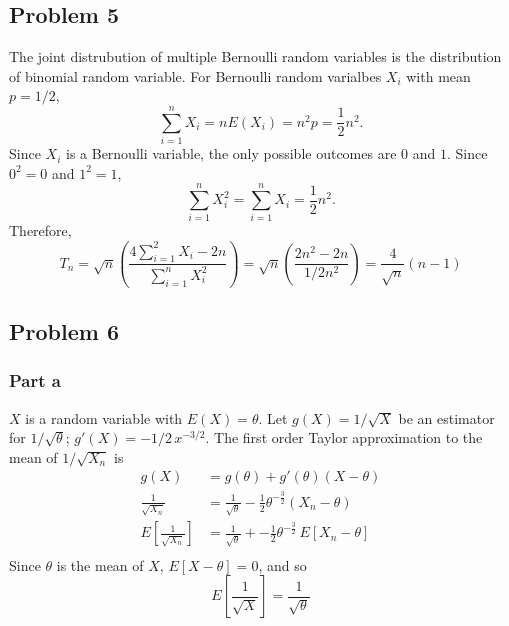 \documentclass{article}
\begin{document}
\iffalse
The probability function of a Poisson random variable with $E(x) = \lambda$ is \[\frac{\lambda^je^{-\lambda}}{j!},\] so for $X_k$ with $E(X_k) = k^{-2}$, \[f_{X_k}(x) = \frac{k^{-2j}\exp\left(-\frac{1}{k^2}\right)}{j!},\] for all non-negative integrers $j$, and $0$ otherwise.
$T_n$ can then be expressed as the sum of a series 
\[\begin{aligned}
T_n &= \sum_{k=1}^{n}\frac{k^{-2j}\exp\left(-\frac{1}{k^2}\right)}{j!} \\
&=\frac{1}{j!}\sum_{k=1}^{n}\, k^{-2j}e^{-\frac{1}{k^2}}.\end{aligned}\]


Since $e^{-\frac{1}{k^2}} <= 1 $ for all integers $k > 0$, then $k^{-2j}e^{-\frac{1}{k^2}} \leq k^{-2j}$ as well. $k^{-2j}$ or $\frac{1}{k^{2j}}$ is a basic null sequence, so $k^{-2j}e^{-\frac{1}{k^2}}$ is also a null sequence. Since $k^{-2j}e^{-\frac{1}{k^2}}$ is a null sequence, then  $\sum_{k=1}^{n}\, k^{-2j}e^{-\frac{1}{k^2}}$ is a convergent series. Therefore the last entry in the sequence $T_n$, is itself a convergent series. 
\fi

\subsection*{Problem 5}
The joint distrubution of multiple Bernoulli random variables is the distribution of binomial random variable. For Bernoulli random varialbes $X_i$ with mean $p = 1/2$, \[\sum_{i=1}^n X_i = nE(X_i) = n^2p = \frac{1}{2}n^2.\] Since $X_i$ is a Bernoulli variable, the only possible outcomes are $0$ and $1$. Since $0^2=0$ and $1^2=1$, \[\sum_{i=1}^n X_i^2 = \sum_{i=1}^n X_i = \frac{1}{2}n^2.\] Therefore, \[T_n = \sqrt{n}\left(\frac{4\sum_{i=1}^2 X_i - 2n}{\sum_{i=1}^n X_i^2}\right) = \sqrt{n}\left(\frac{2n^2-2n}{1/2n^2}\right) = \frac{4}{\sqrt{n}}(n-1)\]

\subsection*{Problem 6}
\subsubsection*{Part a}
$X$ is a random variable with $E(X) = \theta$. Let $g(X) = 1/\sqrt{X}$ be an estimator for $1/\sqrt{\theta}$; $g'(X) = -1/2\,x^{-3/2}.$ The first order Taylor approximation to the mean of $1/\sqrt{X_n}$ is
\[\begin{aligned}
g(X) &= g(\theta)+g'(\theta)(X-\theta) \\
\frac{1}{\sqrt{X_n}} &= \frac{1}{\sqrt{\theta}} -\frac{1}{2}\theta^{-\frac{3}{2}}(X_n - \theta) \\
E\left[\frac{1}{\sqrt{X_n}}\right] &= \frac{1}{\sqrt{\theta}} + -\frac{1}{2}\theta^{-\frac{3}{2}}\,E\left[X_n - \theta\right] \\
\end{aligned}\]
Since $\theta$ is the mean of $X$, $E[X-\theta] = 0$, and so 
\[E\left[\frac{1}{\sqrt{X}}\right] = \frac{1}{\sqrt{\theta}}\]
\end{document}
